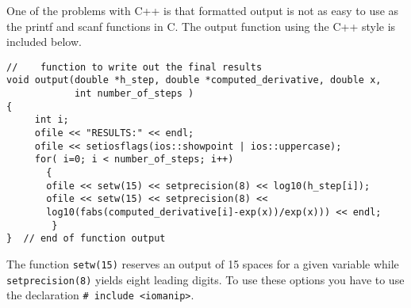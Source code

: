 One of the problems with C++ is that formatted output is not as easy to use as 
the printf and scanf functions in C. The output function using the C++ style is included
below.
\begin{lstlisting}
//    function to write out the final results  
void output(double *h_step, double *computed_derivative, double x, 
            int number_of_steps )
{
     int i;
     ofile << "RESULTS:" << endl;
     ofile << setiosflags(ios::showpoint | ios::uppercase);
     for( i=0; i < number_of_steps; i++)
       {
       ofile << setw(15) << setprecision(8) << log10(h_step[i]);
       ofile << setw(15) << setprecision(8) << 
       log10(fabs(computed_derivative[i]-exp(x))/exp(x))) << endl;
        }
}  // end of function output
\end{lstlisting}
The function \verb?setw(15)? reserves an output of 15 spaces for a given variable
while \verb?setprecision(8)? yields eight leading digits. To use these options
you have to use the declaration \verb?# include <iomanip>?.

